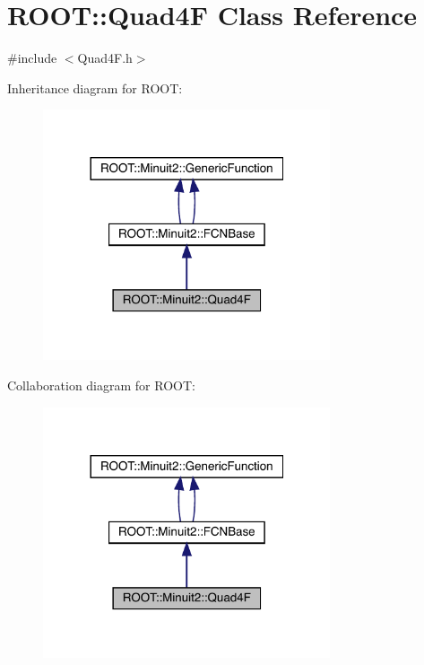 \hypertarget{classROOT_1_1Minuit2_1_1Quad4F}{}\section{R\+O\+OT\+:\+:Quad4F Class Reference}
\label{classROOT_1_1Minuit2_1_1Quad4F}


{\ttfamily \#include $<$Quad4\+F.\+h$>$}



Inheritance diagram for R\+O\+OT\+:\nopagebreak
\begin{figure}[H]
\begin{center}
\leavevmode
\includegraphics[width=240pt]{da/d05/classROOT_1_1Minuit2_1_1Quad4F__inherit__graph}
\end{center}
\end{figure}


Collaboration diagram for R\+O\+OT\+:\nopagebreak
\begin{figure}[H]
\begin{center}
\leavevmode
\includegraphics[width=240pt]{d6/d95/classROOT_1_1Minuit2_1_1Quad4F__coll__graph}
\end{center}
\end{figure}
